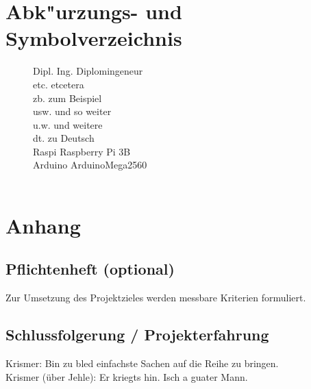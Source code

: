 \documentclass[12pt,a4paper]{article}
\newcommand{\yhbu}[0]{\color{ydkbu}}	%
\newcommand{\korr}[0]{\color{corrclr}\fontsize{8pt}{9pt}\selectfont\bf} %
\newcommand\tbs{\textbackslash}		%
\begin{document}
\section{Abk"urzungs- und Symbolverzeichnis}
\begin{figure}[h!]
Dipl. Ing. \dotfill Diplomingeneur \\
etc. \dotfill etcetera\\
zb. \dotfill zum Beispiel\\
usw. \dotfill und so weiter\\
u.w. \dotfill und weitere\\
dt. \dotfill zu Deutsch\\
Raspi \dotfill Raspberry Pi 3B\\
Arduino \dotfill ArduinoMega2560\\
\dotfill\\
\end{figure}
%
%
%
\renewcommand{\thesection}{\arabic{section}}
\newpage
\section{Anhang}
\appendix
\renewcommand{\thesection}{\Alph{section}}
\setcounter{section}{1}
\setcounter{subsection}{0}
 \subsection{Pflichtenheft (optional)}
	{\yhbu Zur Umsetzung des Projektzieles werden messbare Kriterien formuliert.}
 \subsection{Schlussfolgerung / Projekterfahrung}
	Krismer: Bin zu bled einfachste Sachen auf die Reihe zu bringen. \\
	Krismer (über Jehle): Er kriegts hin. Isch a guater Mann. \\
\end{document}

